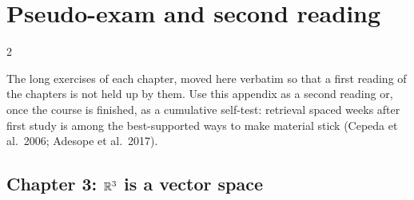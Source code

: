 \chapter{Pseudo-exam and second reading}\label{app:exam}
\begin{paracol}{2}

The long exercises of each chapter, moved here verbatim so that a first reading of the chapters is not held
up by them. Use this appendix as a second reading or, once the course is finished, as a cumulative
self-test: retrieval spaced weeks after first study is among the best-supported ways to make material stick
(Cepeda et al.\ 2006; Adesope et al.\ 2017).

\section*{Chapter 3: $\mathbb{R}^3$ is a vector space}


\end{paracol}
